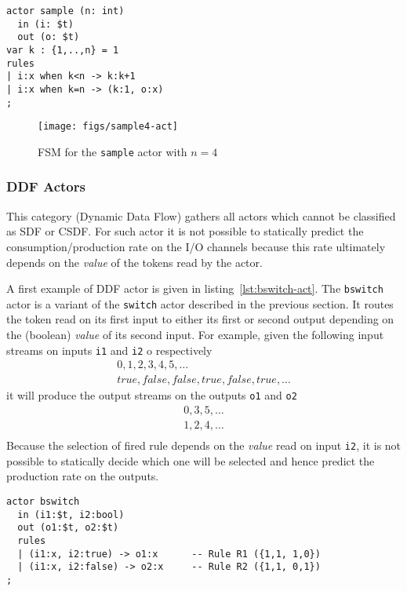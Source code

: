 \begin{lstlisting}[caption={A $n \rightarrow 1$ subsampling actor},label={lst:cpn-ex3}]
actor sample (n: int)
  in (i: $t)
  out (o: $t)
var k : {1,..,n} = 1
rules
| i:x when k<n -> k:k+1
| i:x when k=n -> (k:1, o:x)
;
\end{lstlisting}

\begin{figure}[h]
  \centering
  \texttt{[image: figs/sample4-act]}
  \caption{FSM for the \texttt{sample} actor with $n=4$}
  \label{fig:cpn-ex3b}
\end{figure}

\subsubsection{DDF Actors}
\label{sec:ddf-actors}

This category (Dynamic Data Flow) gathers all actors which cannot be classified as SDF or CSDF. 
For such actor it is not possible to statically predict the consumption/production rate on the I/O
channels because this rate ultimately depends on the \emph{value} of the tokens read by the actor. 

\medskip
\noindent
A first example of DDF actor is given in listing~\ref{lst:bswitch-act}. The \verb|bswitch| actor is
a variant of the \verb|switch| actor described in the previous section. It
routes the token read on its first input to either its first or second output depending on the
(boolean) \emph{value} of its second input. For example, given the following input streams on inputs \verb|i1| and \verb|i2| o
respectively
\begin{eqnarray*}
  0,        1,     2,    3,     4,    5, \ldots \\
  true, false, false, true, false, true, \ldots
\end{eqnarray*}
it will produce the output streams on the outputs \verb|o1| and \verb|o2|
\begin{eqnarray*}
  0, 3, 5, \ldots \\
  1, 2, 4, \ldots \\
\end{eqnarray*}
Because the selection of fired rule depends on the \emph{value} read on input \texttt{i2}, it is
not possible to statically decide which one will be selected and hence predict the production rate on
the outputs.

\begin{lstlisting}[caption={A simple DDF actor in CAPH},label=lst:bswitch-act]
actor bswitch
  in (i1:$t, i2:bool)
  out (o1:$t, o2:$t)
  rules
  | (i1:x, i2:true) -> o1:x      -- Rule R1 ({1,1, 1,0})
  | (i1:x, i2:false) -> o2:x     -- Rule R2 ({1,1, 0,1})
;
\end{lstlisting}

